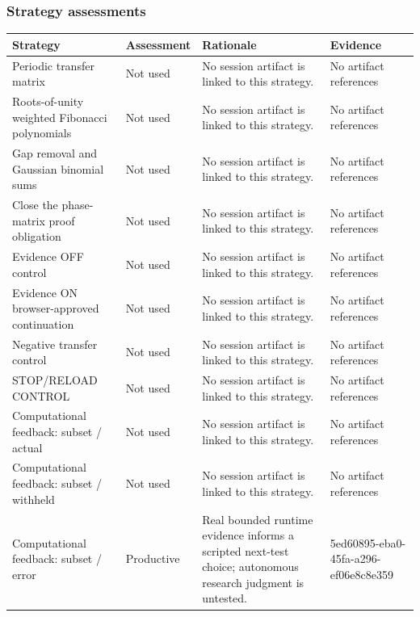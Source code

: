 \documentclass[11pt]{article}
\begin{document}
\subsubsection*{Strategy assessments}
\begin{longtable}{>{\raggedright\arraybackslash}p{.16\linewidth}>{\raggedright\arraybackslash}p{.15\linewidth}>{\raggedright\arraybackslash}p{.40\linewidth}>{\raggedright\arraybackslash}p{.17\linewidth}}
\toprule Strategy & Assessment & Rationale & Evidence \\
\midrule\endhead
Periodic transfer matrix & Not used & No session artifact is linked to this strategy. & No artifact references \\
Roots-of-unity weighted Fibonacci polynomials & Not used & No session artifact is linked to this strategy. & No artifact references \\
Gap removal and Gaussian binomial sums & Not used & No session artifact is linked to this strategy. & No artifact references \\
Close the phase-matrix proof obligation & Not used & No session artifact is linked to this strategy. & No artifact references \\
Evidence OFF control & Not used & No session artifact is linked to this strategy. & No artifact references \\
Evidence ON browser-approved continuation & Not used & No session artifact is linked to this strategy. & No artifact references \\
Negative transfer control & Not used & No session artifact is linked to this strategy. & No artifact references \\
STOP/RELOAD CONTROL & Not used & No session artifact is linked to this strategy. & No artifact references \\
Computational feedback: subset / actual & Not used & No session artifact is linked to this strategy. & No artifact references \\
Computational feedback: subset / withheld & Not used & No session artifact is linked to this strategy. & No artifact references \\
Computational feedback: subset / error & Productive & Real bounded runtime evidence informs a scripted next-test choice; autonomous research judgment is untested. & 5ed60895-eba0-45fa-a296-ef06e8c8e359 \\
\bottomrule
\end{longtable}
\end{document}
